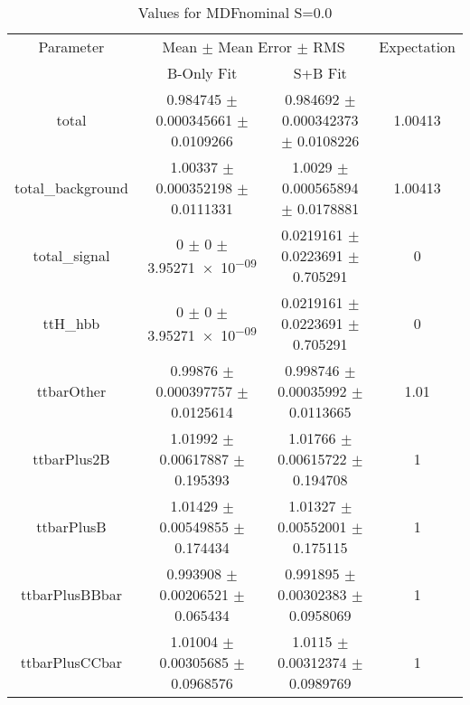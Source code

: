 \begin{table}
\centering
\caption{Values for MDFnominal S=0.0}
\begin{tabular}{cccc}
\toprule
Parameter & \multicolumn{2}{c}{Mean $\pm$ Mean Error $\pm$ RMS} & Expectation\\
 & B-Only Fit & S+B Fit & \\
\midrule
total & \num{0.984745} $\pm$ \num{0.000345661} $\pm$ \num{0.0109266} & \num{0.984692} $\pm$ \num{0.000342373} $\pm$ \num{0.0108226} & \num{1.00413}\\
total\_background & \num{1.00337} $\pm$ \num{0.000352198} $\pm$ \num{0.0111331} & \num{1.0029} $\pm$ \num{0.000565894} $\pm$ \num{0.0178881} & \num{1.00413}\\
total\_signal & \num{0} $\pm$ \num{0} $\pm$ \num{3.95271e-09} & \num{0.0219161} $\pm$ \num{0.0223691} $\pm$ \num{0.705291} & \num{0}\\
ttH\_hbb & \num{0} $\pm$ \num{0} $\pm$ \num{3.95271e-09} & \num{0.0219161} $\pm$ \num{0.0223691} $\pm$ \num{0.705291} & \num{0}\\
ttbarOther & \num{0.99876} $\pm$ \num{0.000397757} $\pm$ \num{0.0125614} & \num{0.998746} $\pm$ \num{0.00035992} $\pm$ \num{0.0113665} & \num{1.01}\\
ttbarPlus2B & \num{1.01992} $\pm$ \num{0.00617887} $\pm$ \num{0.195393} & \num{1.01766} $\pm$ \num{0.00615722} $\pm$ \num{0.194708} & \num{1}\\
ttbarPlusB & \num{1.01429} $\pm$ \num{0.00549855} $\pm$ \num{0.174434} & \num{1.01327} $\pm$ \num{0.00552001} $\pm$ \num{0.175115} & \num{1}\\
ttbarPlusBBbar & \num{0.993908} $\pm$ \num{0.00206521} $\pm$ \num{0.065434} & \num{0.991895} $\pm$ \num{0.00302383} $\pm$ \num{0.0958069} & \num{1}\\
ttbarPlusCCbar & \num{1.01004} $\pm$ \num{0.00305685} $\pm$ \num{0.0968576} & \num{1.0115} $\pm$ \num{0.00312374} $\pm$ \num{0.0989769} & \num{1}\\
\bottomrule
\end{tabular}
\end{table}